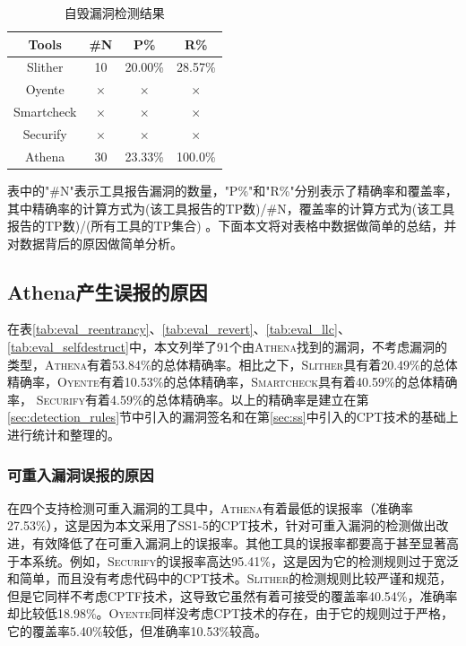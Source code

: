 \begin{table}[htbp]
\begin{minipage}[t]{0.48\textwidth}
  \label{tab:eval_llc}%
  \end{minipage}
  \begin{minipage}[t]{0.48\textwidth}
    \caption{自毁漏洞检测结果}
    \begin{tabular}{cccc}
    \toprule
    Tools & \#N & P\% & R\% \\
    \midrule
    Slither & 10    & 20.00\%    & 28.57\% \\
    Oyente  & $\times$ & $\times$ & $\times$ \\
    Smartcheck  & $\times$ & $\times$ & $\times$ \\
    Securify & $\times$  & $\times$ & $\times$ \\
    Athena & 30    & 23.33\%     & 100.0\% \\
    \bottomrule
    \end{tabular}%
  \label{tab:eval_selfdestruct}%
  \end{minipage}
    \label{tab:eval_all}
\end{table}%

表中的"\#N"表示工具报告漏洞的数量，"P\%"和"R\%"分别表示了精确率和覆盖率，其中精确率的计算方式为(该工具报告的TP数)/\#N，覆盖率的计算方式为(该工具报告的TP数)/(所有工具的TP集合) 。下面本文将对表格中数据做简单的总结，并对数据背后的原因做简单分析。

\subsection{Athena产生误报的原因}

在表\ref{tab:eval_reentrancy}、\ref{tab:eval_revert}、\ref{tab:eval_llc}、\ref{tab:eval_selfdestruct}中，本文列举了91个由\textsc{Athena}找到的漏洞，不考虑漏洞的类型，\textsc{Athena}有着53.84\%的总体精确率。相比之下，\textsc{Slither}具有着20.49\%的总体精确率，\textsc{Oyente}有着10.53\%的总体精确率，\textsc{Smartcheck}具有着40.59\%的总体精确率， \textsc{Securify}有着4.59\%的总体精确率。以上的精确率是建立在第\ref{sec:detection_rules}节中引入的漏洞签名和在第\ref{sec:ss}中引入的CPT技术的基础上进行统计和整理的。

\subsubsection{可重入漏洞误报的原因}

在四个支持检测可重入漏洞的工具中，\textsc{Athena}有着最低的误报率（准确率27.53\%），这是因为本文采用了SS1-5的CPT技术，针对可重入漏洞的检测做出改进，有效降低了在可重入漏洞上的误报率。其他工具的误报率都要高于甚至显著高于本系统。例如，\textsc{Securify}的误报率高达95.41\%，这是因为它的检测规则过于宽泛和简单，而且没有考虑代码中的CPT技术。\textsc{Slither}的检测规则比较严谨和规范，但是它同样不考虑CPTF技术，这导致它虽然有着可接受的覆盖率40.54\%，准确率却比较低18.98\%。\textsc{Oyente}同样没考虑CPT技术的存在，由于它的规则过于严格，它的覆盖率5.40\%较低，但准确率10.53\%较高。

